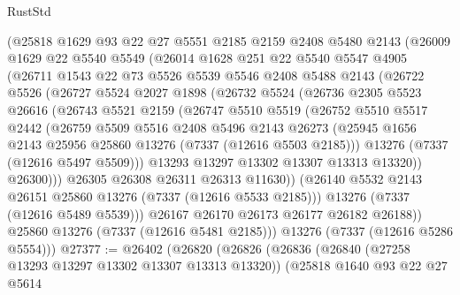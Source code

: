 \begin{lexlean}{RustStd}
\begin{coremodule}
      (@25818
        @1629
        @93
        @22
        @27
        @5551
        @2185
        @2159
        @2408
        @5480
        @2143
        (@26009
          @1629
          @22
          @5540
          @5549
          (@26014
            @1628
            @251
            @22
            @5540
            @5547
            @4905
            (@26711
              @1543
              @22
              @73
              @5526
              @5539
              @5546
              @2408
              @5488
              @2143
              (@26722
                @5526
                (@26727
                  @5524
                  @2027
                  @1898
                  (@26732
                    @5524
                    (@26736
                      @2305
                      @5523
                      @26616
                      (@26743
                        @5521
                        @2159
                        (@26747
                          @5510
                          @5519
                          (@26752
                            @5510
                            @5517
                            @2442
                            (@26759
                              @5509
                              @5516
                              @2408
                              @5496
                              @2143
                              @26273
                              (@25945 @1656 @2143 @25956 @25860 @13276 (@7337 (@12616 @5503 @2185)))
                              @13276
                              (@7337 (@12616 @5497 @5509)))
                            @13293
                            @13297
                            @13302
                            @13307
                            @13313
                            @13320))
                        @26300)))
                  @26305
                  @26308
                  @26311
                  @26313
                  @11630))
              (@26140 @5532 @2143 @26151 @25860 @13276 (@7337 (@12616 @5533 @2185)))
              @13276
              (@7337 (@12616 @5489 @5539)))
            @26167
            @26170
            @26173
            @26177
            @26182
            @26188))
        @25860
        @13276
        (@7337 (@12616 @5481 @2185)))
      @13276
      (@7337 (@12616 @5286 @5554)))
@27377 := @26402
    (@26820
      (@26826
        (@26836
          (@26840 (@27258 @13293 @13297 @13302 @13307 @13313 @13320))
          (@25818
            @1640
            @93
            @22
            @27
            @5614

\end{coremodule}
\end{lexlean}
